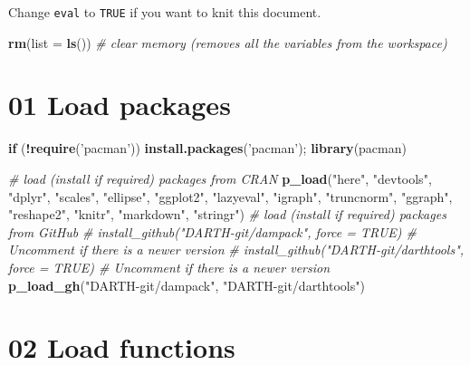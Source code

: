 \documentclass[]{article}
\newenvironment{Shaded}{\begin{snugshade}}{\end{snugshade}}
\newcommand{\KeywordTok}[1]{\textcolor[rgb]{0.13,0.29,0.53}{\textbf{#1}}}
\newcommand{\DataTypeTok}[1]{\textcolor[rgb]{0.13,0.29,0.53}{#1}}
\newcommand{\StringTok}[1]{\textcolor[rgb]{0.31,0.60,0.02}{#1}}
\newcommand{\CommentTok}[1]{\textcolor[rgb]{0.56,0.35,0.01}{\textit{#1}}}
\newcommand{\ControlFlowTok}[1]{\textcolor[rgb]{0.13,0.29,0.53}{\textbf{#1}}}
\newcommand{\OperatorTok}[1]{\textcolor[rgb]{0.81,0.36,0.00}{\textbf{#1}}}
\newcommand{\NormalTok}[1]{#1}
\begin{document}
\newpage

Change \texttt{eval} to \texttt{TRUE} if you want to knit this document.

\begin{Shaded}
\begin{Highlighting}[]
\KeywordTok{rm}\NormalTok{(}\DataTypeTok{list =} \KeywordTok{ls}\NormalTok{())      }\CommentTok{# clear memory (removes all the variables from the workspace)}
\end{Highlighting}
\end{Shaded}

\section{01 Load packages}\label{load-packages}

\begin{Shaded}
\begin{Highlighting}[]
\ControlFlowTok{if}\NormalTok{ (}\OperatorTok{!}\KeywordTok{require}\NormalTok{(}\StringTok{'pacman'}\NormalTok{)) }\KeywordTok{install.packages}\NormalTok{(}\StringTok{'pacman'}\NormalTok{); }\KeywordTok{library}\NormalTok{(pacman) }

\CommentTok{# load (install if required) packages from CRAN}
\KeywordTok{p_load}\NormalTok{(}\StringTok{"here"}\NormalTok{, }\StringTok{"devtools"}\NormalTok{, }\StringTok{"dplyr"}\NormalTok{, }\StringTok{"scales"}\NormalTok{, }\StringTok{"ellipse"}\NormalTok{, }\StringTok{"ggplot2"}\NormalTok{, }\StringTok{"lazyeval"}\NormalTok{, }\StringTok{"igraph"}\NormalTok{, }\StringTok{"truncnorm"}\NormalTok{, }\StringTok{"ggraph"}\NormalTok{, }\StringTok{"reshape2"}\NormalTok{, }\StringTok{"knitr"}\NormalTok{, }\StringTok{"markdown"}\NormalTok{, }\StringTok{"stringr"}\NormalTok{)}
\CommentTok{# load (install if required) packages from GitHub}
\CommentTok{# install_github("DARTH-git/dampack", force = TRUE) # Uncomment if there is a newer version}
\CommentTok{# install_github("DARTH-git/darthtools", force = TRUE) # Uncomment if there is a newer version}
\KeywordTok{p_load_gh}\NormalTok{(}\StringTok{"DARTH-git/dampack"}\NormalTok{, }\StringTok{"DARTH-git/darthtools"}\NormalTok{)}
\end{Highlighting}
\end{Shaded}

\section{02 Load functions}\label{load-functions}
\end{document}
